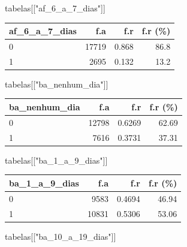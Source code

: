 \documentclass[
]{article}
\newenvironment{Shaded}{\begin{snugshade}}{\end{snugshade}}
\newcommand{\NormalTok}[1]{\textcolor[rgb]{0.00,0.23,0.31}{#1}}
\newcommand{\StringTok}[1]{\textcolor[rgb]{0.13,0.47,0.30}{#1}}
\begin{document}
\begin{Shaded}
\begin{Highlighting}[]
\NormalTok{tabelas[[}\StringTok{"af\_6\_a\_7\_dias"}\NormalTok{]]}
\end{Highlighting}
\end{Shaded}

\begin{longtable}[]{@{}lrrr@{}}
\toprule()
af\_6\_a\_7\_dias & f.a & f.r & f.r (\%) \\
\midrule()
\endhead
0 & 17719 & 0.868 & 86.8 \\
1 & 2695 & 0.132 & 13.2 \\
\bottomrule()
\end{longtable}

\begin{Shaded}
\begin{Highlighting}[]
\NormalTok{tabelas[[}\StringTok{"ba\_nenhum\_dia"}\NormalTok{]]}
\end{Highlighting}
\end{Shaded}

\begin{longtable}[]{@{}lrrr@{}}
\toprule()
ba\_nenhum\_dia & f.a & f.r & f.r (\%) \\
\midrule()
\endhead
0 & 12798 & 0.6269 & 62.69 \\
1 & 7616 & 0.3731 & 37.31 \\
\bottomrule()
\end{longtable}

\begin{Shaded}
\begin{Highlighting}[]
\NormalTok{tabelas[[}\StringTok{"ba\_1\_a\_9\_dias"}\NormalTok{]]}
\end{Highlighting}
\end{Shaded}

\begin{longtable}[]{@{}lrrr@{}}
\toprule()
ba\_1\_a\_9\_dias & f.a & f.r & f.r (\%) \\
\midrule()
\endhead
0 & 9583 & 0.4694 & 46.94 \\
1 & 10831 & 0.5306 & 53.06 \\
\bottomrule()
\end{longtable}

\begin{Shaded}
\begin{Highlighting}[]
\NormalTok{tabelas[[}\StringTok{"ba\_10\_a\_19\_dias"}\NormalTok{]]}
\end{Highlighting}
\end{Shaded}
\end{document}
